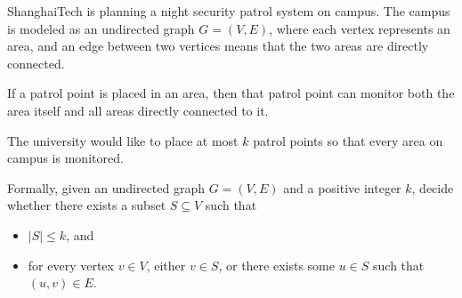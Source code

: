 \problem{}
ShanghaiTech is planning a night security patrol system on campus.
The campus is modeled as an undirected graph $G=(V,E)$, where each vertex represents an area, and an edge between two vertices means that the two areas are directly connected.

If a patrol point is placed in an area, then that patrol point can monitor both the area itself and all areas directly connected to it.

The university would like to place at most $k$ patrol points so that every area on campus is monitored.

Formally, given an undirected graph $G=(V,E)$ and a positive integer $k$, decide whether there exists a subset $S\subseteq V$ such that
\begin{itemize}
	\item $|S|\le k$, and
	\item for every vertex $v\in V$, either $v\in S$, or there exists some $u\in S$ such that $(u,v)\in E$.
\end{itemize}

